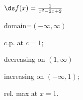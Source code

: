 {$\ds f(x) =\frac{1}{x^2-2x+2}$
}
{domain=$(-\infty,\infty)$

c.p. at $c=1$; 

decreasing on $(1,\infty)$

increasing on $(-\infty,1)$;

rel. max at $x=1$.
}
